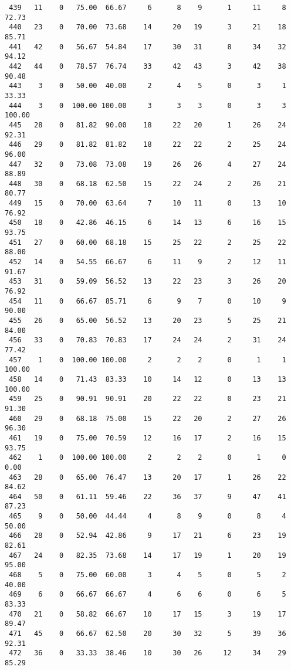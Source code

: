 \begin{verbatim}
 439   11    0   75.00  66.67     6      8    9      1     11     8    72.73
 440   23    0   70.00  73.68    14     20   19      3     21    18    85.71
 441   42    0   56.67  54.84    17     30   31      8     34    32    94.12
 442   44    0   78.57  76.74    33     42   43      3     42    38    90.48
 443    3    0   50.00  40.00     2      4    5      0      3     1    33.33
 444    3    0  100.00 100.00     3      3    3      0      3     3   100.00
 445   28    0   81.82  90.00    18     22   20      1     26    24    92.31
 446   29    0   81.82  81.82    18     22   22      2     25    24    96.00
 447   32    0   73.08  73.08    19     26   26      4     27    24    88.89
 448   30    0   68.18  62.50    15     22   24      2     26    21    80.77
 449   15    0   70.00  63.64     7     10   11      0     13    10    76.92
 450   18    0   42.86  46.15     6     14   13      6     16    15    93.75
 451   27    0   60.00  68.18    15     25   22      2     25    22    88.00
 452   14    0   54.55  66.67     6     11    9      2     12    11    91.67
 453   31    0   59.09  56.52    13     22   23      3     26    20    76.92
 454   11    0   66.67  85.71     6      9    7      0     10     9    90.00
 455   26    0   65.00  56.52    13     20   23      5     25    21    84.00
 456   33    0   70.83  70.83    17     24   24      2     31    24    77.42
 457    1    0  100.00 100.00     2      2    2      0      1     1   100.00
 458   14    0   71.43  83.33    10     14   12      0     13    13   100.00
 459   25    0   90.91  90.91    20     22   22      0     23    21    91.30
 460   29    0   68.18  75.00    15     22   20      2     27    26    96.30
 461   19    0   75.00  70.59    12     16   17      2     16    15    93.75
 462    1    0  100.00 100.00     2      2    2      0      1     0     0.00
 463   28    0   65.00  76.47    13     20   17      1     26    22    84.62
 464   50    0   61.11  59.46    22     36   37      9     47    41    87.23
 465    9    0   50.00  44.44     4      8    9      0      8     4    50.00
 466   28    0   52.94  42.86     9     17   21      6     23    19    82.61
 467   24    0   82.35  73.68    14     17   19      1     20    19    95.00
 468    5    0   75.00  60.00     3      4    5      0      5     2    40.00
 469    6    0   66.67  66.67     4      6    6      0      6     5    83.33
 470   21    0   58.82  66.67    10     17   15      3     19    17    89.47
 471   45    0   66.67  62.50    20     30   32      5     39    36    92.31
 472   36    0   33.33  38.46    10     30   26     12     34    29    85.29

\end{verbatim}

